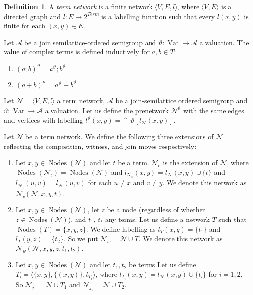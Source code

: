 \documentclass[a4paper]{article}
\theoremstyle{definition}
\newtheorem{definition}{Definition}
\theoremstyle{theorem}
\theoremstyle{proposition}
\theoremstyle{lemma}
\theoremstyle{ex}
\theoremstyle{corollary}
\theoremstyle{claim}
\newcommand{\up}[1]{\ensuremath{{\uparrow}\,#1}}
\begin{document}
\begin{definition}
  A \emph{term network} is a finite network $\langle V, E, l \rangle$, where $\langle V, E \rangle$ is a directed graph and $l : E \to 2^{Term}$ is a labelling function such that every $l(x,y)$ is finite for each $(x, y) \in E$.
\end{definition}

Let $\mathcal{A}$ be a join semilattice-ordered semigroup and $\vartheta : \operatorname{Var} \to \mathcal{A}$ a valuation. The value of complex terms is defined inductively for $a, b \in T$:

\begin{enumerate}
  \item $(a ; b)^{\vartheta} = a^{\vartheta} ; b^{\vartheta}$
  \item $(a + b)^{\vartheta} = a^{\vartheta} + b^{\vartheta}$
\end{enumerate}

Let $\mathcal{N} = \langle V, E, l \rangle$ a term network, $\mathcal{A}$ be a join-semilattice ordered semigroup and $\vartheta : \operatorname{Var} \to {\mathcal{A}}$ a valuation. Let us define the prenetwork $\mathcal{N}^{\vartheta}$ with the same edges and vertices with labelling $l^{\vartheta}(x, y) = \up \vartheta[l_{\mathcal{N}}(x, y)]$.

Let $\mathcal{N}$ be a term network. We define the following three extensions of $\mathcal{N}$ reflecting the composition, witness, and join moves respectively:
\begin{enumerate}
  \item Let $x, y \in \operatorname{Nodes}(\mathcal{N})$ and let $t$ be a term. $\mathcal{N}_c$ is the extension of $\mathcal{N}$,
  where $\operatorname{Nodes}(\mathcal{N}_c) = \operatorname{Nodes}(\mathcal{N})$ and $l_{\mathcal{N}_c}(x, y) = l_{\mathcal{N}}(x, y) \cup \{ t\}$ and $l_{\mathcal{N}_c}(u, v) = l_{\mathcal{N}}(u, v)$ for each $u \neq x$ and $v \neq y$. We denote this network as $\mathcal{N}_c(\mathcal{N}, x, y, t)$.
  \item
  Let $x, y \in \operatorname{Nodes}(\mathcal{N})$, let $z$ be a node (regardless of whether $z \in \operatorname{Nodes}(\mathcal{N})$), and $t_1$, $t_2$ any terms. Let us define a network $T$ such that $\operatorname{Nodes}(T) = \{ x, y, z\}$. We define labelling as $l_{T}(x, y) = \{ t_1 \}$ and $l_{T}(y, z) = \{ t_2 \}$. So we put $\mathcal{N}_w = \mathcal{N} \cup T$.
  We denote this network as $\mathcal{N}_w(\mathcal{N}, x,y,z, t_1, t_2)$.
  \item Let $x, y \in \operatorname{Nodes}(\mathcal{N})$ and let $t_1, t_2$ be terms
  Let us define $T_i = \langle \{ x, y\}, \{ (x, y) \}, l_{T_i} \rangle$, where $l_{T_i}(x, y) = l_{\mathcal{N}}(x, y) \cup \{ t_i \}$ for $i = 1,2$. So $\mathcal{N}_{j_1} = \mathcal{N} \cup T_1$ and $\mathcal{N}_{j_2} = \mathcal{N} \cup T_2$.
\end{enumerate}
\end{document}
